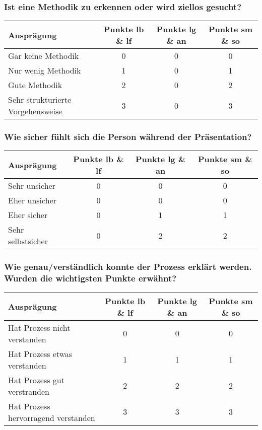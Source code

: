 \subsubsection{Ist eine Methodik zu erkennen oder wird ziellos gesucht?}
\begin{tabular}{| l | c | c | c |}
  \hline	
  \textbf{Ausprägung} & \textbf{Punkte lb \& lf} & \textbf{Punkte lg \& an} & \textbf{Punkte sm \& so} \\
  \hline  		
  Gar keine Methodik & 0  & 0 & 0 \\ 
  \hline
  Nur wenig Methodik & 1 & 0 & 1 \\ 
  \hline
  Gute Methodik & 2 & 0 & 2 \\
  \hline  
  Sehr strukturierte Vorgehensweise & 3 & 0 &  3 \\
  \hline  
\end{tabular}

\subsubsection{Wie sicher fühlt sich die Person während der Präsentation?}
\begin{tabular}{| l | c | c | c |}
  \hline	
  \textbf{Ausprägung} & \textbf{Punkte lb \& lf} & \textbf{Punkte lg \& an} & \textbf{Punkte sm \& so} \\
  \hline  		
  Sehr unsicher & 0  & 0 & 0 \\ 
  \hline
  Eher unsicher & 0 & 0 & 0 \\ 
  \hline
  Eher sicher & 0 & 1 & 1 \\
  \hline  
  Sehr selbstsicher & 0 & 2 &  2 \\
  \hline  
\end{tabular}

\subsubsection{Wie genau/verständlich konnte der Prozess erklärt werden. Wurden die wichtigsten Punkte erwähnt?}
\begin{tabular}{| l | c | c | c |}
  \hline	
  \textbf{Ausprägung} & \textbf{Punkte lb \& lf} & \textbf{Punkte lg \& an} & \textbf{Punkte sm \& so} \\
  \hline  		
  Hat Prozess nicht verstanden & 0  & 0 & 0 \\ 
  \hline
  Hat Prozess etwas verstanden & 1 & 1 & 1 \\ 
  \hline
  Hat Prozess gut verstranden & 2 & 2 & 2 \\
  \hline  
  Hat Prozess hervorragend verstanden & 3 & 3 &  3 \\
  \hline  
\end{tabular}


